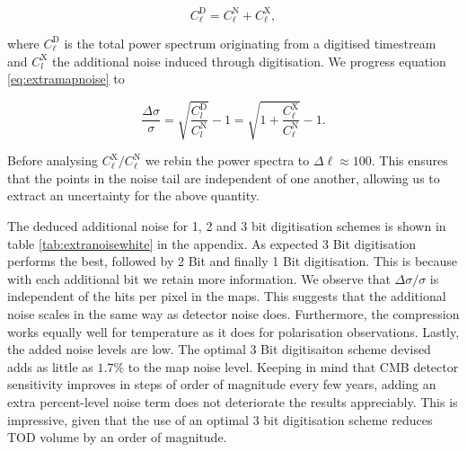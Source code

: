 \documentclass[apj]{emulateapj}
\begin{document}
\begin{equation} C_{\ell}^\mathrm{D} = C_\ell^\mathrm{N} + C_\ell^\mathrm{X}, \end{equation}

where $C_\ell^\mathrm{D}$ is the total power spectrum originating from a digitised timestream and $C_l^\mathrm{X}$ the additional noise induced through digitisation. We progress equation \ref{eq:extramapnoise} to

\begin{equation}\frac{\Delta \sigma}{\sigma} = \sqrt{\frac{C_l^\mathrm{D}}{C_l^{\mathrm{N}}}} - 1 = \sqrt{1 + \frac{C_\ell^\mathrm{X}}{C_\ell^{\mathrm{N}}}} - 1. \end{equation}

Before analysing $C_\ell^\mathrm{X}/C_\ell^\mathrm{N}$ we rebin the power spectra to $\Delta \ell \approx 100$. This ensures that the points in the noise tail are independent of one another, allowing us to extract an uncertainty for the above quantity.

The deduced additional noise for 1, 2 and 3 bit digitisation schemes is shown in table \ref{tab:extranoisewhite} in the appendix. As expected 3 Bit digitisation performs the best, followed by 2 Bit and finally 1 Bit digitisation. This is because with each additional bit we retain more information. We observe that $\Delta \sigma / \sigma$ is independent of the hits per pixel in the maps. This suggests that the additional noise scales in the same way as detector noise does. Furthermore, the compression works equally well for temperature as it does for polarisation observations. Lastly, the added noise levels are low. The optimal 3 Bit digitisaiton scheme devised adds as little as $1.7\%$ to the map noise level. Keeping in mind that CMB detector sensitivity improves in steps of order of magnitude every few years, adding an extra percent-level noise term does not deteriorate the results appreciably. This is impressive, given that the use of an optimal 3 bit digitisation scheme reduces TOD volume by an order of magnitude.

\end{document}
